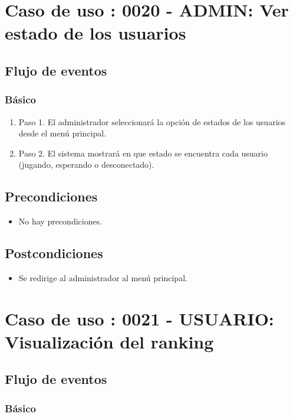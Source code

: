 \section{Caso de uso : 0020 - ADMIN: Ver estado de los usuarios}\label{sec:uc0}
\subsection{Flujo de eventos}
\subsubsection{Básico}

\begin{enumerate}
\item Paso 1.
El administrador seleccionará la opción de estados de los usuarios desde el menú principal.
\item Paso 2.
El sistema mostrará en que estado se encuentra cada usuario (jugando, esperando o desconectado).
\end{enumerate}

\subsection{Precondiciones}
\begin{itemize}
\item No hay precondiciones.
\end{itemize}

\subsection{Postcondiciones}
\begin{itemize}
\item Se redirige al administrador al menú principal.
\end{itemize}



\section{Caso de uso : 0021 - USUARIO: Visualización del ranking}\label{sec:uc0}
\subsection{Flujo de eventos}
\subsubsection{Básico}

